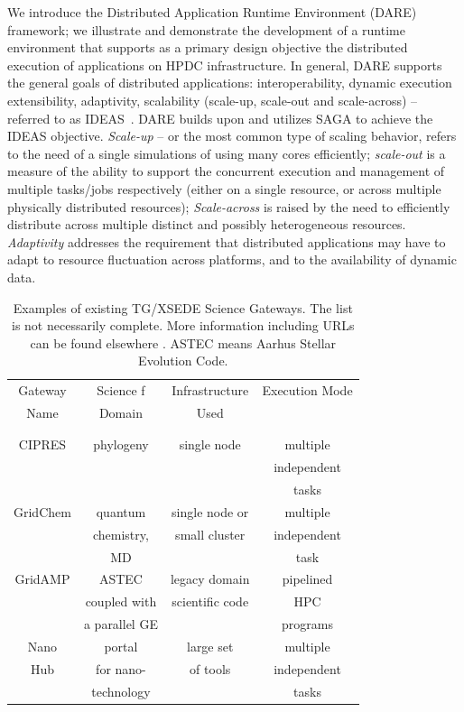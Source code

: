 \documentclass[]{svjour3}
\begin{document}
We introduce the Distributed Application Runtime Environment (DARE)
framework; we illustrate and demonstrate the development of a runtime
environment that supports as a primary design objective the
distributed execution of applications on HPDC infrastructure.  In
general, DARE supports the general goals of distributed applications:
interoperability, dynamic execution %
extensibility, adaptivity, scalability (scale-up, scale-out and
scale-across) -- referred to as IDEAS~\cite{ideas}.  DARE builds upon
and utilizes SAGA to achieve the IDEAS objective.  {\it Scale-up} --
or the most common type of scaling behavior, refers to the need of a
single simulations of using many cores efficiently; {\it scale-out} is
a measure of the ability to support the concurrent execution and
management of multiple tasks/jobs respectively (either on a single
resource, or across multiple physically distributed resources); {\it
  Scale-across} is raised by the need to efficiently distribute across
multiple distinct and possibly heterogeneous resources. {\it
  Adaptivity} addresses the requirement that distributed applications
may have to adapt to resource fluctuation across platforms, and to the
availability of dynamic data.

\begin{table}
\centering
 \small
\begin{tabular}{|c|c|c|c|} 
  \hline Gateway  & Science f & Infrastructure & Execution Mode 
  \\
  Name & Domain & Used & \\ 
  &  &  & \\
  & & & \\  \hline \hline 
  
  CIPRES   & phylogeny  &  single node  & multiple  \\
   &  &   & independent   \\ 
  &  &  &  tasks \\  \hline
  GridChem   & quantum & single node or     & multiple  \\
     & chemistry, & small cluster & independent   \\
  & MD &  & task  \\ \hline
   GridAMP     & ASTEC  & legacy domain  & pipelined \\ 
  & coupled with  &  scientific code   & HPC  \\
  & a parallel GE &   &  programs \\ \hline
  Nano  & portal  & large set   & multiple \\
  Hub  & for nano- & of tools  & independent \\
   & technology &  & tasks \\ \hline
  \hline
\end{tabular} \caption{Examples of existing TG/XSEDE Science Gateways. The list is not necessarily complete. More information including URLs can be found elsewhere \cite{tg-sg-list-url}. ASTEC means Aarhus Stellar Evolution Code.}
 \label{table:TG-sg} 
\end{table}
\end{document}
